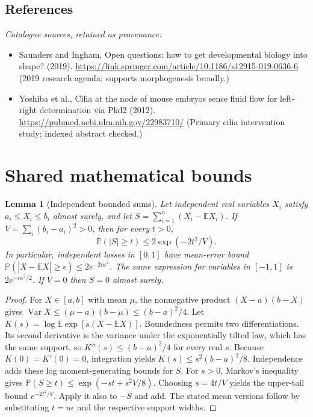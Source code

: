 \documentclass[11pt]{article}
\newcommand{\E}{\mathbb E}
\newcommand{\Prob}{\mathbb P}
\DeclareMathOperator{\Var}{Var}
\providecommand{\E}{\mathbb E}
\providecommand{\Prob}{\mathbb P}
\providecommand{\Var}{\operatorname{Var}}
\newtheorem{sharedlemma}{Lemma}[section]
\begin{document}
\subsection{References}
\noindent\emph{Catalogue sources, retained as provenance:}
\begin{itemize}
\item Saunders and Ingham, Open questions: how to get developmental biology into shape? (2019). \url{https://link.springer.com/article/10.1186/s12915-019-0636-6} (2019 research agenda; supports morphogenesis broadly.)
\item Yoshiba et al., Cilia at the node of mouse embryos sense fluid flow for left-right determination via Pkd2 (2012). \url{https://pubmed.ncbi.nlm.nih.gov/22983710/} (Primary cilia intervention study; indexed abstract checked.)
\end{itemize}
\clearpage


\appendix
\section{Shared mathematical bounds}\label{app:bounds}
\begin{sharedlemma}[Independent bounded sums]\label{lem:bounded}
Let independent real variables $X_i$ satisfy $a_i\leq X_i\leq b_i$ almost surely,
and let $S=\sum_{i=1}^n(X_i-\E X_i)$. If
$V=\sum_i(b_i-a_i)^2>0$, then for every $t>0$,
\[
 \Prob(|S|\geq t)\leq 2\exp(-2t^2/V).
\]
In particular, independent losses in $[0,1]$ have mean-error bound
$\Prob(|\overline X-\E\overline X|\geq\epsilon)
\leq2e^{-2n\epsilon^2}$. The same expression for variables in $[-1,1]$
is $2e^{-n\epsilon^2/2}$. If $V=0$ then $S=0$ almost surely.
\end{sharedlemma}
\begin{proof}
For $X\in[a,b]$ with mean $\mu$, the nonnegative product
$(X-a)(b-X)$ gives
$\Var X\leq(\mu-a)(b-\mu)\leq(b-a)^2/4$.
Let $K(s)=\log\E\exp[s(X-\E X)]$.
Boundedness permits two differentiations. Its second derivative is the variance
under the exponentially tilted law, which has the same support, so
$K''(s)\leq(b-a)^2/4$ for every real $s$.
Because $K(0)=K'(0)=0$, integration yields
$K(s)\leq s^2(b-a)^2/8$.
Independence adds these log moment-generating bounds for $S$.
For $s>0$, Markov's inequality gives
$\Prob(S\geq t)\leq\exp(-st+s^2V/8)$.
Choosing $s=4t/V$ yields the upper-tail bound $e^{-2t^2/V}$.
Apply it also to $-S$ and add. The stated mean versions follow by substituting
$t=n\epsilon$ and the respective support widths.
\end{proof}
\end{document}
